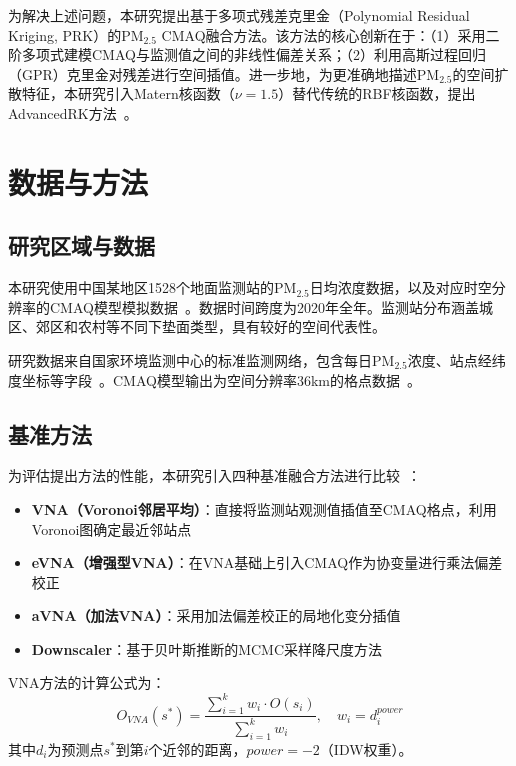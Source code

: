 \documentclass[UTF8, a4paper, 12pt]{article}
\begin{document}
为解决上述问题，本研究提出基于多项式残差克里金（Polynomial Residual Kriging, PRK）的PM$_{2.5}$ CMAQ融合方法。该方法的核心创新在于：（1）采用二阶多项式建模CMAQ与监测值之间的非线性偏差关系；（2）利用高斯过程回归（GPR）克里金对残差进行空间插值。进一步地，为更准确地描述PM$_{2.5}$的空间扩散特征，本研究引入Matern核函数（$\nu=1.5$）替代传统的RBF核函数，提出AdvancedRK方法~\cite{rasmussen2006gaussian}。

\section{数据与方法}

\subsection{研究区域与数据}

本研究使用中国某地区1528个地面监测站的PM$_{2.5}$日均浓度数据，以及对应时空分辨率的CMAQ模型模拟数据~\cite{foley2010CMAQ}。数据时间跨度为2020年全年。监测站分布涵盖城区、郊区和农村等不同下垫面类型，具有较好的空间代表性。

研究数据来自国家环境监测中心的标准监测网络，包含每日PM$_{2.5}$浓度、站点经纬度坐标等字段~\cite{chang2015outlier}。CMAQ模型输出为空间分辨率36km的格点数据~\cite{rodriguez2025downscaling}。

\subsection{基准方法}

为评估提出方法的性能，本研究引入四种基准融合方法进行比较~\cite{liu2019spatial}：

\begin{itemize}
    \item \textbf{VNA（Voronoi邻居平均）}：直接将监测站观测值插值至CMAQ格点，利用Voronoi图确定最近邻站点~\cite{singh2019enhanced}

    \item \textbf{eVNA（增强型VNA）}：在VNA基础上引入CMAQ作为协变量进行乘法偏差校正

    \item \textbf{aVNA（加法VNA）}：采用加法偏差校正的局地化变分插值

    \item \textbf{Downscaler}：基于贝叶斯推断的MCMC采样降尺度方法
\end{itemize}

VNA方法的计算公式为：
\begin{equation}
O_{VNA}(s^*) = \frac{\sum_{i=1}^{k} w_i \cdot O(s_i)}{\sum_{i=1}^{k} w_i}, \quad w_i = d_i^{power}
\end{equation}
其中$d_i$为预测点$s^*$到第$i$个近邻的距离，$power=-2$（IDW权重）。
\end{document}
